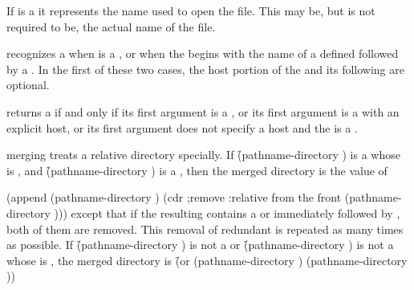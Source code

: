 If  is a 
it represents the name used to open the file. This may be, but is
not required to be, the actual name of the file. 

 recognizes a  
   when  is a ,
or when the  begins with 
    the name of a defined  followed by a .
In the first of these two cases,
the host portion of the  
and its following  are optional.

 returns a 
 if and only if
   its first argument is a ,
or its first argument is a   with an explicit host,
or its first argument does not specify a host 
    and the  is a .
 
 merging treats a relative directory specially.  
If \f{(pathname-directory )} is a  whose
 is , and 
\f{(pathname-directory )} is a , then
the merged directory is the value of

\code
 (append (pathname-directory )
         (cdr  ;remove :relative from the front
           (pathname-directory )))
\endcode
except that if the resulting  contains a  or 
immediately followed by , both of them are removed.  This removal of 
redundant   is repeated as many times as possible.
If \f{(pathname-directory )} is not a  or
\f{(pathname-directory )} is not a  
whose  is , the merged directory is
\f{(or (pathname-directory ) (pathname-directory ))}

